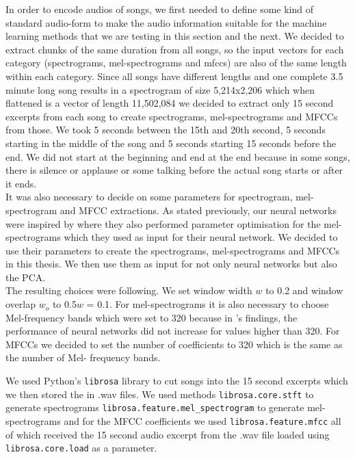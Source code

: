 In order to encode audios of songs, we first needed to define some kind of standard audio-form to make the audio information suitable for the machine learning methods that we are testing in this section and the next. We decided to extract chunks of the same duration from all songs, so the input vectors for each category (spectrograms, mel-spectrograms and mfccs) are also of the same length within each category. Since all songs have different lengths and one complete 3.5 minute long song results in a spectrogram of size 5,214x2,206 which when flattened is a vector of length 11,502,084 we decided to extract only 15 second excerpts from each song to create spectrograms, mel-spectrograms and MFCCs from those. We took 5 seconds between the 15th and 20th second, 5 seconds starting in the middle of the song and 5 seconds starting 15 seconds before the end. We did not start at the beginning and end at the end because in some songs, there is silence or applause or some talking before the actual song starts or after it ends. \\

It was also necessary to decide on some parameters for spectrogram, mel-spectrogram and MFCC extractions. As stated previously, our neural networks were inspired by \cite{inproceedings_RNNs} where they also performed parameter optimisation for the mel-spectrograms which they used as input for their neural network. We decided to use their parameters to create the spectrograms, mel-spectrograms and MFCCs in this thesis. We then use them as input for not only neural networks but also the PCA. \\
The resulting choices were following. We set window width $w$ to 0.2 and window overlap $w_o$ to 0.5$w$ = 0.1. For mel-spectrograms it is also necessary to choose Mel-frequency bands which were set to 320 because in \cite{inproceedings_RNNs}'s findings, the performance of neural networks did not increase for values higher than 320. For MFCCs we decided to set the number of coefficients to 320 which is the same as the number of Mel- frequency bands.

We used Python's \texttt{librosa} library \cite{brian_mcfee_2019_2564164} to cut songs into the 15 second excerpts which we then stored the in .wav files. We used methods \texttt{librosa.core.stft} to generate spectrograms \texttt{librosa.feature.mel\_spectrogram} to generate mel-spectrograms and for the MFCC coefficients we used \texttt{librosa.feature.mfcc} all of which received the 15 second audio excerpt from the .wav file loaded using \texttt{librosa.core.load} as a parameter. 

